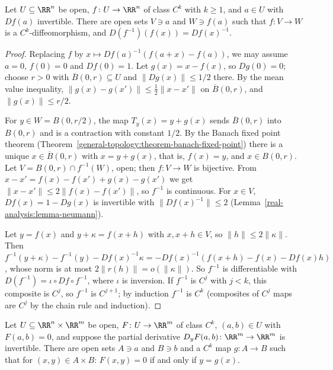 \begin{theorem}\label{real-analysis:theorem-inverse-function}
Let $U \subseteq \RR^n$ be open, $f \colon U \to \RR^n$ of class $C^k$ with $k \geq 1$, and $a \in U$ with $Df(a)$ invertible. There are open sets $V \ni a$ and $W \ni f(a)$ such that $f \colon V \to W$ is a
$C^k$-diffeomorphism, and $D(f^{-1})(f(x)) = Df(x)^{-1}$.
\end{theorem}

\begin{proof}
Replacing $f$ by $x \mapsto Df(a)^{-1}(f(a + x) - f(a))$, we may assume $a = 0$, $f(0) = 0$ and $Df(0) = 1$. Let $g(x) = x - f(x)$, so $Dg(0) = 0$; choose $r > 0$ with $\overline{B}(0, r) \subseteq U$ and
$\|Dg(x)\| \leq 1/2$ there. By the mean value inequality, $\|g(x) - g(x')\| \leq \frac12\|x - x'\|$ on $\overline{B}(0, r)$, and $\|g(x)\| \leq r/2$.

For $y \in W = B(0, r/2)$, the map $T_y(x) = y + g(x)$ sends $\overline{B}(0, r)$ into $B(0, r)$ and is a contraction with constant $1/2$. By the Banach fixed point theorem
(Theorem~\ref{general-topology:theorem-banach-fixed-point}) there is a unique $x \in \overline{B}(0, r)$ with $x = y + g(x)$, that is, $f(x) = y$, and $x \in B(0, r)$. Let $V = B(0, r) \cap f^{-1}(W)$, open; then
$f \colon V \to W$ is bijective. From $x - x' = f(x) - f(x') + g(x) - g(x')$ we get $\|x - x'\| \leq 2\|f(x) - f(x')\|$, so $f^{-1}$ is continuous. For $x \in V$, $Df(x) = 1 - Dg(x)$ is invertible
with $\|Df(x)^{-1}\| \leq 2$ (Lemma~\ref{real-analysis:lemma-neumann}).

Let $y = f(x)$ and $y + \kappa = f(x + h)$ with $x, x + h \in V$, so $\|h\| \leq 2\|\kappa\|$. Then $f^{-1}(y + \kappa) - f^{-1}(y) - Df(x)^{-1}\kappa = -Df(x)^{-1}(f(x + h) - f(x) - Df(x)h)$, whose norm is
at most $2\|r(h)\| = o(\|\kappa\|)$. So $f^{-1}$ is differentiable with $D(f^{-1}) = \iota \circ Df \circ f^{-1}$, where $\iota$ is inversion. If $f^{-1}$ is $C^j$ with $j < k$, this composite is $C^j$, so
$f^{-1}$ is $C^{j+1}$; by induction $f^{-1}$ is $C^k$ (composites of $C^j$ maps are $C^j$ by the chain rule and induction).
\end{proof}

\begin{theorem}\label{real-analysis:theorem-implicit-function}
Let $U \subseteq \RR^n \times \RR^m$ be open, $F \colon U \to \RR^m$ of class $C^k$, $(a, b) \in U$ with $F(a, b) = 0$, and suppose the partial derivative $D_yF(a, b) \colon \RR^m \to \RR^m$ is invertible.
There are open sets $A \ni a$ and $B \ni b$ and a $C^k$ map $g \colon A \to B$ such that for $(x, y) \in A \times B$: $F(x, y) = 0$ if and only if $y = g(x)$.
\end{theorem}

